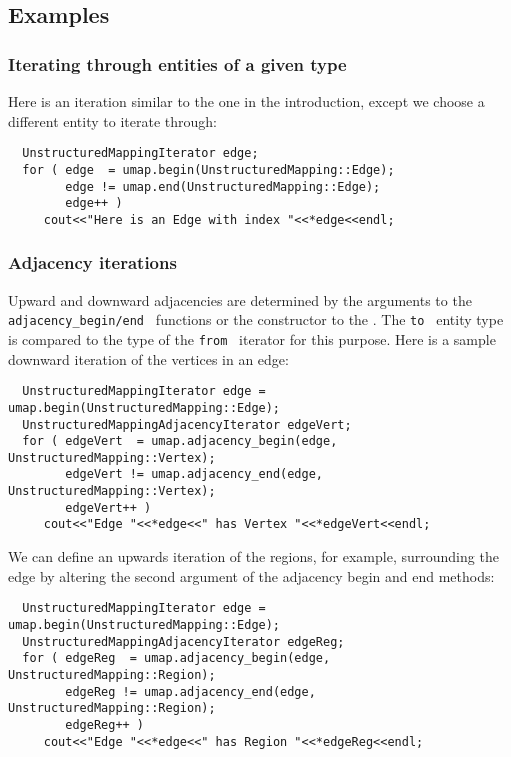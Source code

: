 \subsection{Examples}
\subsubsection{Iterating through entities of a given type}
Here is an iteration similar to the one in the introduction,
except we choose a different entity to iterate through:
\begin{verbatim}
  UnstructuredMappingIterator edge;
  for ( edge  = umap.begin(UnstructuredMapping::Edge);
        edge != umap.end(UnstructuredMapping::Edge);
        edge++ )
     cout<<"Here is an Edge with index "<<*edge<<endl;
\end{verbatim}
\subsubsection{Adjacency iterations}
Upward and downward adjacencies are determined by the arguments
to the {\tt adjacency\_begin/end } functions or the constructor
to the \umapAI.  The {\tt to } entity type is compared to the
type of the {\tt from } iterator for this purpose.  Here is
a sample downward iteration of the vertices in an edge:
\begin{verbatim}
  UnstructuredMappingIterator edge = umap.begin(UnstructuredMapping::Edge);
  UnstructuredMappingAdjacencyIterator edgeVert;
  for ( edgeVert  = umap.adjacency_begin(edge, UnstructuredMapping::Vertex);
        edgeVert != umap.adjacency_end(edge, UnstructuredMapping::Vertex);
        edgeVert++ )
     cout<<"Edge "<<*edge<<" has Vertex "<<*edgeVert<<endl;
\end{verbatim}
We can define an upwards iteration of the regions, for example, surrounding
the edge by altering the second argument of the adjacency begin and end methods:
\begin{verbatim}
  UnstructuredMappingIterator edge = umap.begin(UnstructuredMapping::Edge);
  UnstructuredMappingAdjacencyIterator edgeReg;
  for ( edgeReg  = umap.adjacency_begin(edge, UnstructuredMapping::Region);
        edgeReg != umap.adjacency_end(edge, UnstructuredMapping::Region);
        edgeReg++ )
     cout<<"Edge "<<*edge<<" has Region "<<*edgeReg<<endl;
\end{verbatim}
